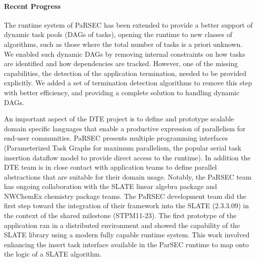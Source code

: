 \paragraph{Recent Progress}
The runtime system of PaRSEC has been extended to provide a better support of
dynamic task pools (DAGs of tasks), opening the runtime to new classes of
algorithms, such as those where the total number of tasks is a priori unknown.
We enabled such dynamic DAGs by removing internal constraints on how tasks are
identified and how dependencies are tracked. However, one of the missing
capabilities, the detection of the application termination, needed to be
provided explicitly.
We added a set of termination detection algorithms to remove this step with
better efficiency, and providing a complete solution to handling dynamic DAGs.


An important aspect of the DTE project is to define and prototype scalable
domain specific languages that enable a productive expression of parallelism for
end-user communities. PaRSEC presents multiple programming interfaces
(Parameterized Task Graphs for maximum parallelism, the popular serial task
insertion dataflow model to provide direct access to the runtime). In addition
the DTE team is in close contact with application teams to define parallel
abstractions that are suitable for their domain usage. Notably, the PaRSEC team
has ongoing collaboration with the SLATE linear algebra package and NWChemEx
chemistry package teams.
The PaRSEC development team did the first step toward the integration
of their framework into the SLATE (2.3.3.09) in the context of the
shared milestone (STPM11-23). The first prototype of the application
ran in a distributed environment and showed the capability of the
SLATE library using a modern fully capable runtime system. This work
involved enhancing the insert task interface available in the ParSEC
runtime to map onto the logic of a SLATE algorithm.

